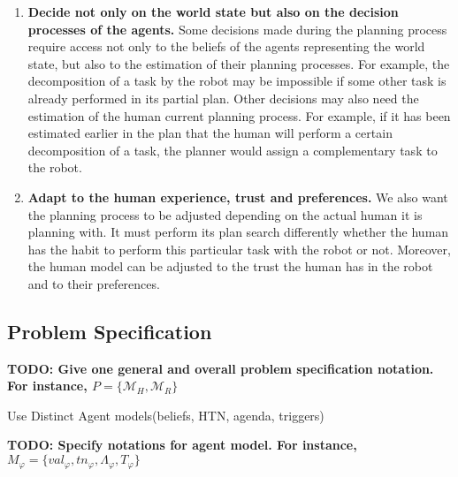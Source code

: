 \begin{enumerate}
    \item \textbf{Decide not only on the world state but also on the decision processes of the agents.} Some decisions made during the planning process require access not only to the beliefs of the agents representing the world state, but also to the estimation of their planning processes. For example, the decomposition of a task by the robot may be impossible if some other task is already performed in its partial plan. Other decisions may also need the estimation of the human current planning process. For example, if it has been estimated earlier in the plan that the human will perform a certain decomposition of a task, the planner would assign a complementary task to the robot.

    \item \textbf{Adapt to the human experience, trust and preferences.} We also want the planning process to be adjusted depending on the actual human it is planning with. It must perform its plan search differently whether the human has the habit to perform this particular task with the robot or not. Moreover, the human model can be adjusted to the trust the human has in the robot and to their preferences.

\end{enumerate}

\subsection{Problem Specification}

\textbf{TODO: Give one general and overall problem specification notation. For instance, $P = \{ \mathcal{M}_H, \mathcal{M}_R \}$}

Use Distinct Agent models(beliefs, HTN, agenda, triggers)

\textbf{TODO: Specify notations for agent model. For instance, $M_\varphi = \{ val_{\varphi}, tn_{\varphi}, \Lambda_{\varphi}, T_{\varphi} \}$}

